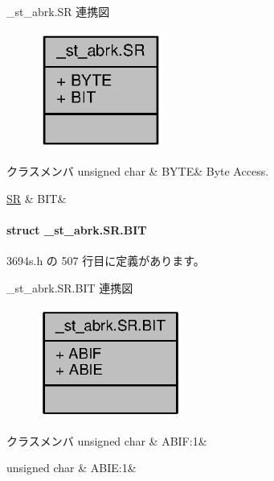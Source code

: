 \+\_\+st\+\_\+abrk.\+S\+R 連携図
\nopagebreak
\begin{figure}[H]
\begin{center}
\leavevmode
\includegraphics[width=116pt]{da/d53/union__st__abrk_8SR__coll__graph}
\end{center}
\end{figure}
\begin{DoxyFields}{クラスメンバ}
unsigned char\label{3694s_8h_ae409eb2ba6eb6801f52763ae370c350e}
&
B\+Y\+T\+E&
Byte Access. \\
\hline

\hyperlink{3694s_8h_d8/d8d/struct__st__abrk_8SR_8BIT}{S\+R}\label{3694s_8h_adb957fdc8000e1eef04a243f5199aa52}
&
B\+I\+T&
\\
\hline

\end{DoxyFields}
\label{struct__st__abrk_8SR_8BIT}
\paragraph{struct \+\_\+st\+\_\+abrk.\+S\+R.\+B\+I\+T}


 3694s.\+h の 507 行目に定義があります。



\+\_\+st\+\_\+abrk.\+S\+R.\+B\+I\+T 連携図
\nopagebreak
\begin{figure}[H]
\begin{center}
\leavevmode
\includegraphics[width=134pt]{d8/df5/struct__st__abrk_8SR_8BIT__coll__graph}
\end{center}
\end{figure}
\begin{DoxyFields}{クラスメンバ}
unsigned char\label{3694s_8h_a38f0fe183e31b8b035e777e36b7c5de8}
&
A\+B\+I\+F\+:1&
\\
\hline

unsigned char\label{3694s_8h_a5634cfd8b89eeddc8735d18c50ae1f5a}
&
A\+B\+I\+E\+:1&
\\
\hline

\end{DoxyFields}
\label{union__st__io_8PUCR1}
